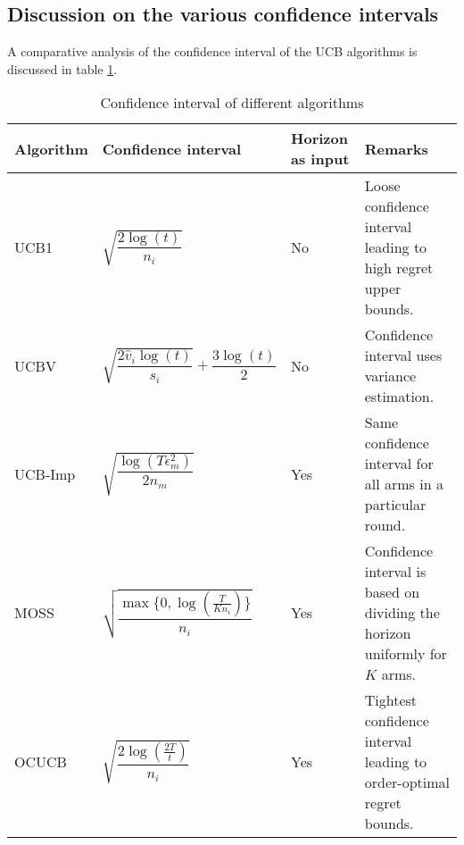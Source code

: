 \subsection{Discussion on the various confidence intervals}

A comparative analysis of the confidence interval of the UCB algorithms is discussed in table \ref{tab:conf-comp}.

\begin{table}[!ht]
\caption{Confidence interval of different algorithms}
\label{tab:conf-comp}
\begin{center}
\begin{tabular}{|p{5em}|p{10em}|p{4em}|p{12em}|}
\hline
Algorithm  &  Confidence interval & Horizon as input & Remarks \\
\hline
\hline
UCB1        & $\sqrt{\dfrac{2\log (t)}{n_i}}$ & No & Loose confidence interval leading to high regret upper bounds.\\%
\hline
\hline
UCBV        & $\sqrt{\dfrac{2\hat{v}_i\log (t)}{s_i}} + \dfrac{3\log (t)}{2}$ & No & Confidence interval uses variance estimation.\\
\hline
\hline
UCB-Imp 		& $\sqrt{\dfrac{\log{( T\epsilon_{m}^{2})}}{2 n_{m}}}$ & Yes & Same confidence interval for all arms in a particular round.\\%
\hline
\hline
MOSS	     	& $\sqrt{\dfrac{\max\lbrace 0,\log(\frac{T}{K n_i})\rbrace}{n_i}}$ & Yes & Confidence interval is based on dividing the horizon uniformly for $K$ arms.\\%
\hline
\hline
OCUCB     	& $\sqrt{\dfrac{2\log(\frac{2T}{t})}{n_i}}$ & Yes & Tightest confidence interval leading to order-optimal regret bounds.\\\midrule
\end{tabular}
\end{center}
\end{table} 
